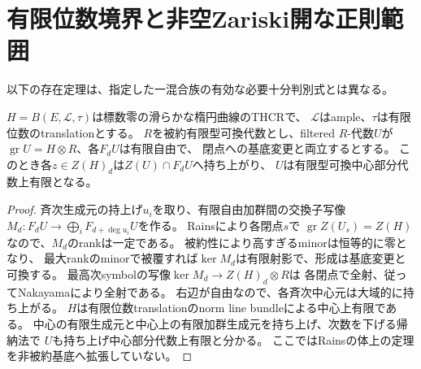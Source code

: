 \section{有限位数境界と非空Zariski開な正則範囲}
\label{sec:quotient-open-regularity}
以下の存在定理は、指定した一混合族の有効な必要十分判別式とは異なる。
\begin{lemma}[被約基底上の中心の持上げ]
\label{lem:global-center-lifting}
$H=B(E,\mathcal L,\tau)$は標数零の滑らかな楕円曲線のTHCRで、
$\mathcal L$はample、$\tau$は有限位数のtranslationとする。
$R$を被約有限型可換代数とし、filtered $R$-代数$U$が
$\operatorname{gr}U=H\otimes R$、各$F_dU$は有限自由で、
閉点への基底変更と両立するとする。
このとき各$z\in Z(H)_d$は$Z(U)\cap F_dU$へ持ち上がり、
$U$は有限型可換中心部分代数上有限となる。
\end{lemma}
\begin{proof}
斉次生成元の持上げ$u_i$を取り、有限自由加群間の交換子写像
$M_d:F_dU\to\bigoplus_iF_{d+\deg u_i}U$を作る。
Rains\cite[Theorem~2.13]{RainsElliptic}により各閉点$s$で
$\operatorname{gr}Z(U_s)=Z(H)$なので、$M_d$のrankは一定である。
被約性により高すぎるminorは恒等的に零となり、
最大rankのminorで被覆すれば$\ker M_d$は有限射影で、形成は基底変更と可換する。
最高次symbolの写像$\ker M_d\to Z(H)_d\otimes R$は
各閉点で全射、従ってNakayamaにより全射である。
右辺が自由なので、各斉次中心元は大域的に持ち上がる。
$H$は有限位数translationのnorm line bundleによる中心上有限である。
中心の有限生成元と中心上の有限加群生成元を持ち上げ、次数を下げる帰納法で
$U$も持ち上げ中心部分代数上有限と分かる。
ここではRainsの体上の定理を非被約基底へ拡張していない。
\end{proof}

